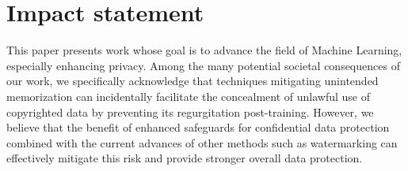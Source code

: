\section*{Impact statement}
This paper presents work whose goal is to advance the field of Machine Learning, especially enhancing privacy. Among the many potential societal consequences of our work, we specifically acknowledge that techniques mitigating unintended memorization can incidentally facilitate the concealment of unlawful use of copyrighted data by preventing its regurgitation post-training. However, we believe that the benefit of enhanced safeguards for confidential data protection combined with the current advances of other methods such as watermarking \citep{li2023black, tang2023did, cui2024diffusion} can effectively mitigate this risk and provide stronger overall data protection.